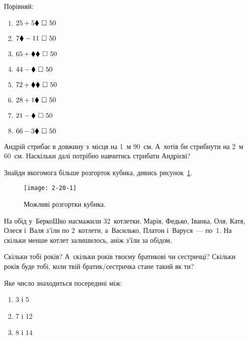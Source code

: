 Порівняй:
\begin{multicols}{2}
    \begin{enumerate}
        \item $25 + 5\hiddendigit \ \square \ 50$
        \item $7\hiddendigit - 11 \ \square \ 50$
        \item $65 + \hiddendigit\hiddendigit \ \square \ 50$
        \item $44 - \hiddendigit \ \square \ 50$
        \item $72 + \hiddendigit\hiddendigit \ \square \ 50$
        \item $28 + 1\hiddendigit \ \square \ 50$
        \item $21 - \hiddendigit \ \square \ 50$
        \item $66 - 3\hiddendigit \ \square \ 50$
    \end{enumerate}
\end{multicols}


\problem
Андрій стрибає в довжину з~місця на 1~м 90~см.
А~хотів би стрибнути на 2~м 60~см.
Наскільки далі потрібно навчитись стрибати Андрієві?


\problem
Знайди якогомога більше розгорток кубика, дивись рисунок~\ref{fig:cubes}.

\begin{figure}[h]
    \centering
    \texttt{[image: 2-20-1]}
    \caption{Можливі розгортки кубика.}
    \label{fig:cubes}
\end{figure}


\problem
На обід у~БеркоШко насмажили 32~котлетки.
Марія, Федько, Іванка, Оля, Катя, Олеся і~Валя з’їли по 2~котлети,
а~Василько, Платон і~Варуся~--- по~1.
На скільки менше котлет залишилось, аніж з’їли за обідом.


\problem
Скільки тобі років?
А~скільки років твоєму братикові чи сестричці?
Скільки років буде тобі, коли твій братик/сестричка стане такий як ти?


\problem
Яке число знаходиться посередині між:
\begin{multicols}{3}
    \begin{enumerate}
        \item 3 і 5
        \item 7 і 12
        \item 8 і 14
    \end{enumerate}
\end{multicols}


